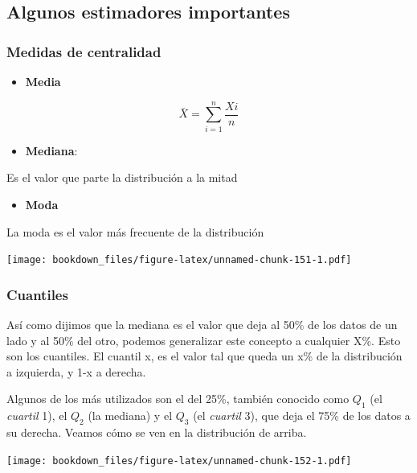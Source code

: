 \documentclass[]{book}
\providecommand{\tightlist}{%
  \setlength{\itemsep}{0pt}\setlength{\parskip}{0pt}}
\begin{document}
\hypertarget{algunos-estimadores-importantes}{%
\subsection{Algunos estimadores importantes}\label{algunos-estimadores-importantes}}

\hypertarget{medidas-de-centralidad}{%
\subsubsection{Medidas de centralidad}\label{medidas-de-centralidad}}

\begin{itemize}
\tightlist
\item
  \textbf{Media}
\end{itemize}

\[
\bar{X}= \sum_{i=1}^n \frac{Xi}{n}
\]

\begin{itemize}
\tightlist
\item
  \textbf{Mediana}:
\end{itemize}

Es el valor que parte la distribución a la mitad

\begin{itemize}
\tightlist
\item
  \textbf{Moda}
\end{itemize}

La moda es el valor más frecuente de la distribución

\texttt{[image: bookdown\_files/figure-latex/unnamed-chunk-151-1.pdf]}

\hypertarget{cuantiles}{%
\subsubsection{Cuantiles}\label{cuantiles}}

Así como dijimos que la mediana es el valor que deja al 50\% de los datos de un lado y al 50\% del otro, podemos generalizar este concepto a cualquier X\%. Esto son los cuantiles. El cuantil x, es el valor tal que queda un x\% de la distribución a izquierda, y 1-x a derecha.

Algunos de los más utilizados son el del 25\%, también conocido como \(Q_1\) (el \emph{cuartil} 1), el \(Q_2\) (la mediana) y el \(Q_3\) (el \emph{cuartil} 3), que deja el 75\% de los datos a su derecha. Veamos cómo se ven en la distribución de arriba.

\texttt{[image: bookdown\_files/figure-latex/unnamed-chunk-152-1.pdf]}
\end{document}
